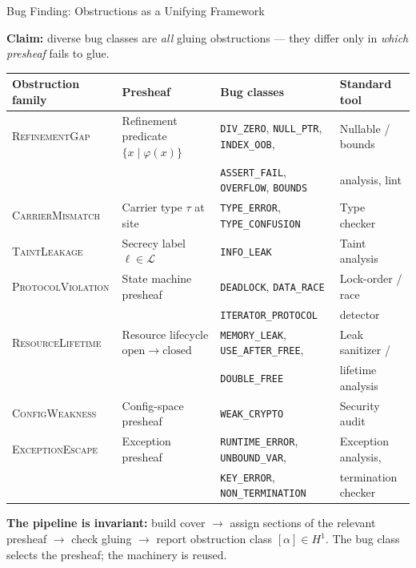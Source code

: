 \documentclass[aspectratio=169,11pt]{beamer}
\begin{document}
\begin{frame}{Bug Finding: Obstructions as a Unifying Framework}

\textbf{Claim:} diverse bug classes are \emph{all} gluing obstructions — they differ
only in \emph{which presheaf} fails to glue.

\vspace{0.3em}
{\small
\begin{tabular}{@{}llll@{}}
\textbf{Obstruction family} & \textbf{Presheaf} & \textbf{Bug classes} & \textbf{Standard tool} \\
\hline
\textsc{RefinementGap} & Refinement predicate $\{x \mid \varphi(x)\}$ &
  \texttt{DIV\_ZERO}, \texttt{NULL\_PTR}, \texttt{INDEX\_OOB}, & Nullable / bounds \\
  & & \texttt{ASSERT\_FAIL}, \texttt{OVERFLOW}, \texttt{BOUNDS} & analysis, lint \\[2pt]
\textsc{CarrierMismatch} & Carrier type $\tau$ at site &
  \texttt{TYPE\_ERROR}, \texttt{TYPE\_CONFUSION} & Type checker \\[2pt]
\textsc{TaintLeakage} & Secrecy label $\ell \in \mathcal{L}$ &
  \texttt{INFO\_LEAK} & Taint analysis \\[2pt]
\textsc{ProtocolViolation} & State machine presheaf &
  \texttt{DEADLOCK}, \texttt{DATA\_RACE} & Lock-order / race \\
  & & \texttt{ITERATOR\_PROTOCOL} & detector \\[2pt]
\textsc{ResourceLifetime} & Resource lifecycle $\mathrm{open} \to \mathrm{closed}$ &
  \texttt{MEMORY\_LEAK}, \texttt{USE\_AFTER\_FREE}, & Leak sanitizer / \\
  & & \texttt{DOUBLE\_FREE} & lifetime analysis \\[2pt]
\textsc{ConfigWeakness} & Config-space presheaf &
  \texttt{WEAK\_CRYPTO} & Security audit \\[2pt]
\textsc{ExceptionEscape} & Exception presheaf &
  \texttt{RUNTIME\_ERROR}, \texttt{UNBOUND\_VAR}, & Exception analysis, \\
  & & \texttt{KEY\_ERROR}, \texttt{NON\_TERMINATION} & termination checker \\
\end{tabular}
}

\vspace{0.3em}
{\small \textbf{The pipeline is invariant:} build cover $\to$ assign sections of the
relevant presheaf $\to$ check gluing $\to$ report obstruction class $[\alpha] \in H^1$.
The bug class selects the presheaf; the machinery is reused.}

\end{frame}
\end{document}
